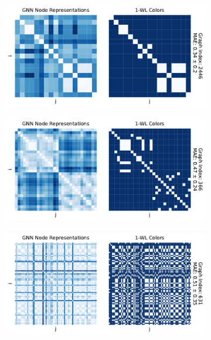 \begin{figure}[!tbh]
\begin{subfigure}[b]{0.49\textwidth}
		\vspace*{-5ex} 
        \caption{\mutag}
	\end{subfigure}
	\hfill
	\begin{subfigure}[b]{0.49\textwidth}
		\centering
		\includegraphics[width=\textwidth]{Figures/heatmaps_NCI1_single.pdf}
		\vspace*{-5ex} 
        \caption{\nci}
	\end{subfigure}
	\par\bigskip
	\begin{subfigure}[b]{0.49\textwidth}
		\centering
		\includegraphics[width=\textwidth]{Figures/heatmaps_PROTEINS_single.pdf}
		\vspace*{-5ex} 
        \caption{\proteins}
	\end{subfigure}
	\hfill
	\begin{subfigure}[b]{0.49\textwidth}
		\centering
		\includegraphics[width=\textwidth]{Figures/heatmaps_REDDIT-BINARY_single.pdf}

\end{subfigure}
\end{figure}
